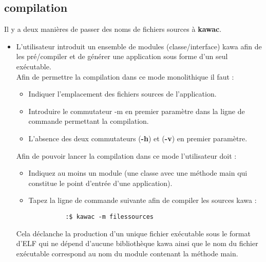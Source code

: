 \documentclass{../res/univ-projet}
\begin{document}
  \subsection{compilation}
    Il y a deux manières de passer des noms de fichiers sources à \textbf{kawac}.
    \begin{itemize}
      \item L’utilisateur introduit un ensemble de modules (classe/interface)
      kawa afin de les pré/compiler et de générer une application sous forme
      d’un seul exécutable.\\

      Afin de permettre la compilation dans ce mode monolithique il faut :
      \begin{itemize}
        \item Indiquer l’emplacement des fichiers sources de l’application.
        \item Introduire le commutateur -m en premier paramètre dans la
        ligne de commande permettant la compilation.
        \item L’absence des deux commutateurs (\textbf{-h}) et (\textbf{-v}) en premier paramètre.
        
      \end{itemize}

      Afin de pouvoir lancer la compilation dans ce mode l’utilisateur doit :
      \begin{itemize}
        \item Indiquez au moins un module (une classe avec une méthode
        main qui constitue le point d’entrée d’une application).
        \item Tapez la ligne de commande suivante afin de compiler les sources kawa :\\
        \begin{verbatim}
          :$ kawac -m filessources
        \end{verbatim}
        
        
      \end{itemize}

      Cela déclanche la production d’un unique fichier exécutable sous le format
      d’ELF qui ne dépend d’aucune bibliothèque kawa ainsi que le nom du fichier 
      exécutable correspond au nom du module contenant la méthode main.\\


\end{itemize}
\end{document}
